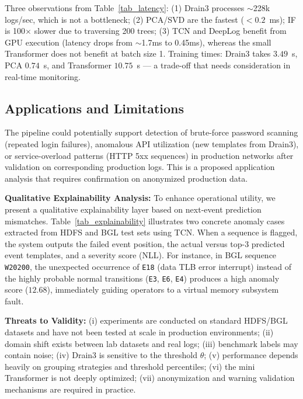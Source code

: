 \documentclass[conference]{IEEEtran}
\begin{document}
Three observations from Table~\ref{tab_latency}: (1) Drain3 processes $\sim$228k logs/sec, which is not a bottleneck; (2) PCA/SVD are the fastest ($<0.2$~ms); IF is 100$\times$ slower due to traversing 200 trees; (3) TCN and DeepLog benefit from GPU execution (latency drops from $\sim$1.7ms to 0.45ms), whereas the small Transformer does not benefit at batch size 1. Training times: Drain3 takes $3.49$~s, PCA $0.74$~s, and Transformer $10.75$~s — a trade-off that needs consideration in real-time monitoring.

\subsection{Applications and Limitations}
The pipeline could potentially support detection of brute-force password scanning (repeated login failures), anomalous API utilization (new templates from Drain3), or service-overload patterns (HTTP 5xx sequences) in production networks after validation on corresponding production logs. This is a proposed application analysis that requires confirmation on anonymized production data.

\textbf{Qualitative Explainability Analysis:} To enhance operational utility, we present a qualitative explainability layer based on next-event prediction mismatches. Table~\ref{tab_explainability} illustrates two concrete anomaly cases extracted from HDFS and BGL test sets using TCN. When a sequence is flagged, the system outputs the failed event position, the actual versus top-3 predicted event templates, and a severity score (NLL). For instance, in BGL sequence \texttt{W20200}, the unexpected occurrence of \texttt{E18} (data TLB error interrupt) instead of the highly probable normal transitions (\texttt{E3}, \texttt{E6}, \texttt{E4}) produces a high anomaly score ($12.68$), immediately guiding operators to a virtual memory subsystem fault.


\textbf{Threats to Validity:} (i) experiments are conducted on standard HDFS/BGL datasets and have not been tested at scale in production environments; (ii) domain shift exists between lab datasets and real logs; (iii) benchmark labels may contain noise; (iv) Drain3 is sensitive to the threshold $\theta$; (v) performance depends heavily on grouping strategies and threshold percentiles; (vi) the mini Transformer is not deeply optimized; (vii) anonymization and warning validation mechanisms are required in practice.
\end{document}
